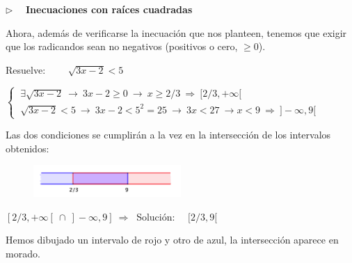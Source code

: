 \vspace{5mm}
\begin{large}
$\triangleright \quad $ \textbf{Inecuaciones con raíces cuadradas}	
\end{large}
\vspace{5mm}

Ahora, además de verificarse la inecuación que nos planteen, tenemos que exigir que los radicandos sean no negativos (positivos o cero, $\geqslant 0$).

\begin{miejemplo}

Resuelve: $\qquad \sqrt{3x-2} < 5$

\vspace{5mm} $\begin{cases}
 \	\exists \sqrt{3x-2} \ \to \ 3x-2\geqslant 0 \ \to \ x\geqslant 2/3
 \ \Rightarrow \ [2/3,+\infty[ \\
 \ \sqrt{3x-2} < 5 \ \to \ 3x-2<5^2=25 \ \to \ 3x<27 \ \to x<9 \ \Rightarrow \ ]-\infty, 9[ 	\end{cases}$

 
\begin{multicols}{2} 
Las dos condiciones se cumplirán a la vez en la intersección de los intervalos obtenidos:  

\begin{figure}[H]
		\centering
		\includegraphics[width=0.5\textwidth]{img-ecc/ecc12.png}
	\end{figure}	
\end{multicols}

\vspace{-4mm}$[2/3,+\infty[ \ \cap \ ]-\infty,9] \ \Rightarrow \ $ Solución: $\quad [2/3,9[$ 

\vspace{2mm}\begin{small} \textcolor{gris}{Hemos dibujado un intervalo de rojo y otro de azul, la intersección aparece en morado.}	 \end{small}
\end{miejemplo}

